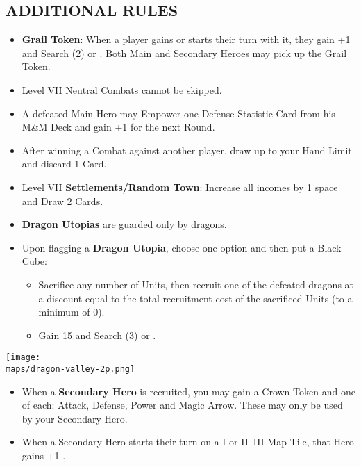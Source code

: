 \begin{multicols*}{2}
\subsection*{\MakeUppercase{Additional Rules}}
\begin{itemize}
  \item \textbf{Grail Token}: When a player gains or starts their turn with it, they gain +1  and Search (2)  or . Both Main and Secondary Heroes may pick up the Grail Token.
  \item Level VII Neutral Combats cannot be skipped.
  \item A defeated Main Hero may Empower one Defense Statistic Card from his M\&M Deck and gain +1  for the next Round.
  \item After winning a Combat against another player, draw up to your Hand Limit and discard 1 Card.
  \item Level VII \textbf{Settlements/Random Town}: Increase all incomes by 1 space and Draw 2 Cards.
  \item \textbf{Dragon Utopias} are guarded only by dragons.
  \item Upon flagging a \textbf{Dragon Utopia}, choose one option and then put a Black Cube:
  \begin{itemize}
    \item Sacrifice any number of Units, then recruit one of the defeated dragons at a discount equal to the total recruitment cost of the sacrificed Units (to a minimum of 0).
    \item Gain 15  and Search (3)  or .
  \end{itemize}
\end{itemize}

\begin{center}
  \vspace*{\fill}
  \texttt{[image: \\maps/dragon-valley-2p.png]}
\end{center}

\begin{itemize}
  \item When a \textbf{Secondary Hero} is recruited, you may gain a Crown Token and one of each: Attack, Defense, Power and Magic Arrow. These may only be used by your Secondary Hero.
  \item When a Secondary Hero starts their turn on a I or II–III Map Tile, that Hero gains +1 .
\end{itemize}


\end{multicols*}
